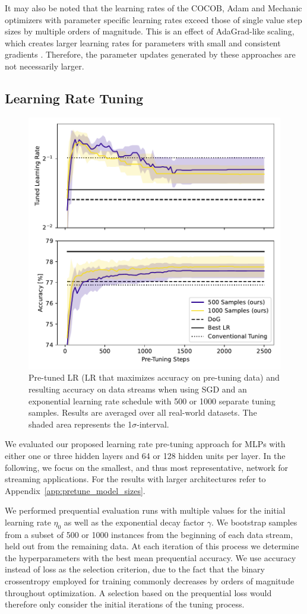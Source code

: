 \documentclass[letterpaper]{article} %
\begin{document}
It may also be noted that the learning rates of the COCOB, Adam and Mechanic optimizers with parameter specific learning rates exceed those of single value step sizes by multiple orders of magnitude.
This is an effect of AdaGrad-like scaling, which creates larger learning rates for parameters with small and consistent gradients \cite{cutkoskyMechanicLearningRate2023}.
Therefore, the parameter updates generated by these approaches are not necessarily larger.



\subsection{Learning Rate Tuning}

\begin{figure}[h]
	\centering
	\includegraphics[width=.45\textwidth]{figures/pretune_1x64_acc_lr_exp_schedule.pdf}
	\caption{Pre-tuned LR (LR that maximizes accuracy on pre-tuning data) and resulting accuracy on data streams when using SGD and an exponential learning rate schedule with 500 or 1000 separate tuning samples. Results are averaged over all real-world datasets. The shaded area represents the 1$\sigma$-interval.}\label{fig:pretune_lr_accuracy}
\end{figure}

We evaluated our proposed learning rate pre-tuning approach for MLPs with either one or three hidden layers and 64 or 128 hidden units per layer.
In the following, we focus on the smallest, and thus most representative, network for streaming applications. 
For the results with larger architectures refer to Appendix~\ref{app:pretune_model_sizes}.

We performed prequential evaluation runs with multiple values for the initial learning rate $\eta_0$ as well as the exponential decay factor $\gamma$. 
We bootstrap samples from a subset of 500 or 1000 instances from the beginning of each data stream, held out from the remaining data.
At each iteration of this process we determine the hyperparameters with the best mean prequential accuracy.
We use accuracy instead of loss as the selection criterion, due to the fact that the binary crossentropy employed for training commonly decreases by orders of magnitude throughout optimization.
A selection based on the prequential loss would therefore only consider the initial iterations of the tuning process.
\end{document}
